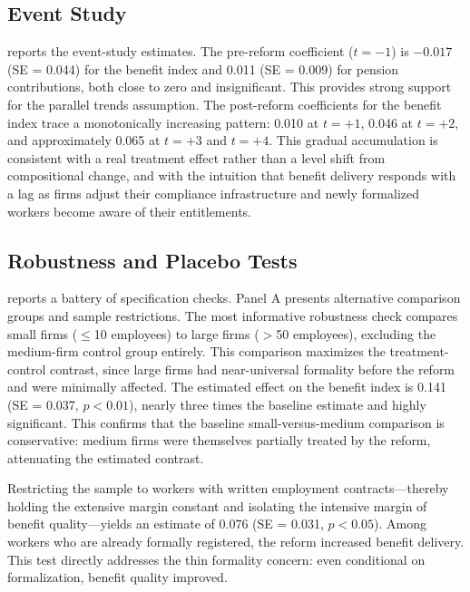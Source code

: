 \documentclass[12pt]{article}
\begin{document}


\subsection{Event Study}

 reports the event-study estimates. The pre-reform coefficient ($t = -1$) is $-0.017$ (SE = 0.044) for the benefit index and 0.011 (SE = 0.009) for pension contributions, both close to zero and insignificant. This provides strong support for the parallel trends assumption. The post-reform coefficients for the benefit index trace a monotonically increasing pattern: 0.010 at $t = +1$, 0.046 at $t = +2$, and approximately 0.065 at $t = +3$ and $t = +4$. This gradual accumulation is consistent with a real treatment effect rather than a level shift from compositional change, and with the intuition that benefit delivery responds with a lag as firms adjust their compliance infrastructure and newly formalized workers become aware of their entitlements.



\subsection{Robustness and Placebo Tests}

 reports a battery of specification checks. Panel A presents alternative comparison groups and sample restrictions. The most informative robustness check compares small firms ($\leq$10 employees) to large firms ($>$50 employees), excluding the medium-firm control group entirely. This comparison maximizes the treatment-control contrast, since large firms had near-universal formality before the reform and were minimally affected. The estimated effect on the benefit index is 0.141 (SE = 0.037, $p<0.01$), nearly three times the baseline estimate and highly significant. This confirms that the baseline small-versus-medium comparison is conservative: medium firms were themselves partially treated by the reform, attenuating the estimated contrast.

Restricting the sample to workers with written employment contracts---thereby holding the extensive margin constant and isolating the intensive margin of benefit quality---yields an estimate of 0.076 (SE = 0.031, $p<0.05$). Among workers who are already formally registered, the reform increased benefit delivery. This test directly addresses the thin formality concern: even conditional on formalization, benefit quality improved.
\end{document}
